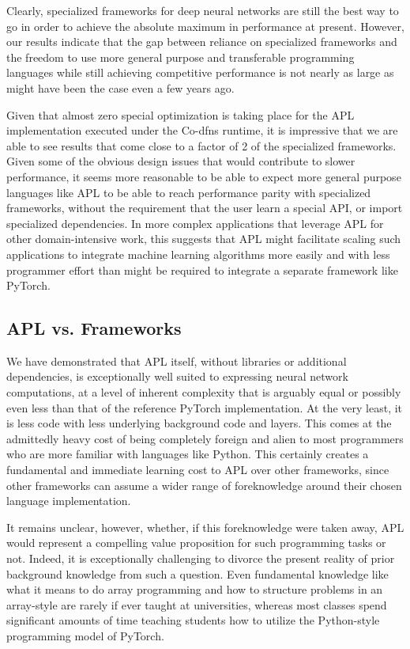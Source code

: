 \documentclass[10pt,twocolumn,english,format=sigplan,screen,balance]{acmart}
\begin{document}
Clearly, specialized frameworks for deep neural networks are still
the best way to go in order to achieve the absolute maximum in performance
at present. However, our results indicate that the gap between reliance
on specialized frameworks and the freedom to use more general purpose
and transferable programming languages while still achieving competitive
performance is not nearly as large as might have been the case even
a few years ago. 

Given that almost zero special optimization is taking place for the
APL implementation executed under the Co-dfns runtime, it is impressive
that we are able to see results that come close to a factor of 2 of
the specialized frameworks. Given some of the obvious design issues
that would contribute to slower performance, it seems more reasonable
to be able to expect more general purpose languages like APL to be
able to reach performance parity with specialized frameworks, without
the requirement that the user learn a special API, or import specialized
dependencies. In more complex applications that leverage APL for other
domain-intensive work, this suggests that APL might facilitate scaling
such applications to integrate machine learning algorithms more easily
and with less programmer effort than might be required to integrate
a separate framework like PyTorch. 

\subsection{APL vs. Frameworks}

We have demonstrated that APL itself, without libraries or additional
dependencies, is exceptionally well suited to expressing neural network
computations, at a level of inherent complexity that is arguably equal
or possibly even less than that of the reference PyTorch implementation.
At the very least, it is less code with less underlying background
code and layers. This comes at the admittedly heavy cost of being
completely foreign and alien to most programmers who are more familiar
with languages like Python. This certainly creates a fundamental and
immediate learning cost to APL over other frameworks, since other
frameworks can assume a wider range of foreknowledge around their
chosen language implementation. 

It remains unclear, however, whether, if this foreknowledge were taken
away, APL would represent a compelling value proposition for such
programming tasks or not. Indeed, it is exceptionally challenging
to divorce the present reality of prior background knowledge from
such a question. Even fundamental knowledge like what it means to
do array programming and how to structure problems in an array-style
are rarely if ever taught at universities, whereas most classes spend
significant amounts of time teaching students how to utilize the Python-style
programming model of PyTorch.
\end{document}
